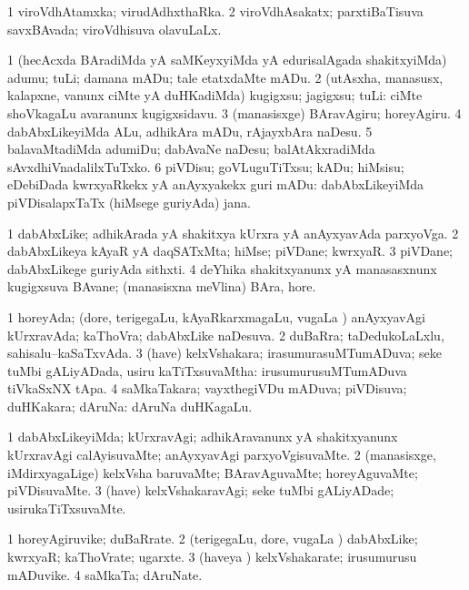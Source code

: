 \bentry
{}
\gl{\gu}
\bmng
\bnum
\num{1} viroVdhAtamxka; virudAdhxthaRka. 
\num{2} viroVdhAsakatx; parxtiBaTisuva savxBAvada; viroVdhisuva olavuLaLx. 
\enum
\emng
\eentry

\bentry
{}
\gl{\sakirx}
\bmng
\bnum
\num{1} (hecAcxda BAradiMda yA saMKeyxyiMda yA edurisalAgada shakitxyiMda) adumu; tuLi; damana mADu; tale etatxdaMte mADu. 
\num{2} (utAsxha, manasusx, kalapxne, \mo vanunx ciMte yA duHKadiMda) kugigxsu; jagigxsu; tuLi:  ciMte shoVkagaLu avaranunx kugigxsidavu. 
\num{3} (manasisxge) BAravAgiru; horeyAgiru. 
\num{4} dabAbxLikeyiMda ALu, adhikAra mADu, rAjayxbAra naDesu. 
\num{5} balavaMtadiMda adumiDu; dabAvaNe naDesu; balAtAkxradiMda sAvxdhiVnadalilxTuTxko. 
\num{6} piVDisu; goVLuguTiTxsu; kADu; hiMsisu; eDebiDada kwrxyaRkekx yA anAyxyakekx guri mADu:  dabAbxLikeyiMda piVDisalapxTaTx (hiMsege guriyAda) jana. 
\enum
\emng
\eentry

\bentry
{}
\gl{\nA}
\bmng
\bnum
\num{1} dabAbxLike; adhikArada yA shakitxya kUrxra yA anAyxyavAda parxyoVga. 
\num{2} dabAbxLikeya kAyaR yA daqSATxMta; hiMse; piVDane; kwrxyaR. 
\num{3} piVDane; dabAbxLikege guriyAda sithxti. 
\num{4} deYhika shakitxyanunx yA manasasxnunx kugigxsuva BAvane; (manasisxna meVlina) BAra, hore. 
\enum
\emng
\eentry

\bentry
{}
\gl{\gu}
\bmng
\bnum
\num{1} horeyAda; (dore, terigegaLu, kAyaRkarxmagaLu, \mo vugaLa \vi) anAyxyavAgi kUrxravAda; kaThoVra; dabAbxLike naDesuva. 
\num{2} duBaRra; taDedukoLaLxlu, sahisalu--kaSaTxvAda. 
\num{3} (have) kelxVshakara; irasumurasuMTumADuva; seke tuMbi gALiyADada, usiru kaTiTxsuvaMtha:  irusumurusuMTumADuva tiVkaSxNX tApa. 
\num{4} saMkaTakara; vayxthegiVDu mADuva; piVDisuva; duHKakara; dAruNa:  dAruNa duHKagaLu. 
\enum
\emng
\eentry

\bentry
{}
\gl{\kirxvi}
\bmng
\bnum
\num{1} dabAbxLikeyiMda; kUrxravAgi; adhikAravanunx yA shakitxyanunx kUrxravAgi calAyisuvaMte; anAyxyavAgi parxyoVgisuvaMte. 
\num{2} (manasisxge, iMdirxyagaLige) kelxVsha baruvaMte; BAravAguvaMte; horeyAguvaMte; piVDisuvaMte. 
\num{3} (have) kelxVshakaravAgi; seke tuMbi gALiyADade; usirukaTiTxsuvaMte. 
\enum
\emng
\eentry

\bentry
{}
\gl{\nA}
\bmng
\bnum
\num{1} horeyAgiruvike; duBaRrate. 
\num{2} (terigegaLu, dore, \mo vugaLa \vi) dabAbxLike; kwrxyaR; kaThoVrate; ugarxte. 
\num{3} (haveya \vi) kelxVshakarate; irusumurusu mADuvike. 
\num{4} saMkaTa; dAruNate. 
\enum
\emng
\eentry

